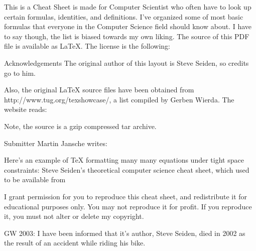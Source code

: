 

This is a Cheat Sheet is made for Computer Scientist who often have to look up certain formulas, identities, and definitions.
I've organized some of most basic formulas that everyone in the Computer Science field should know about. I have to say though, the list is biased towards my own liking.
The source of this PDF file is available as LaTeX. The license is the following:

Acknowledgements
The original author of this layout is Steve Seiden, so credits go to him.

Also, the original LaTeX source files have been obtained from http://www.tug.org/texshowcase/, a list compiled by Gerben Wierda.
The website reads:

Note, the source is a gzip compressed tar archive.

Submitter Martin Jansche writes:

Here's an example of TeX formatting many many equations under tight space constraints: Steve Seiden's theoretical computer science cheat sheet, which used to be available from

    I grant permission for you to reproduce this cheat sheet, and redistribute it for educational purposes only. You may not reproduce it for profit. If you reproduce it, you must not alter or delete my copyright.

GW 2003: I have been informed that it's author, Steve Seiden, died in 2002 as the result of an accident while riding his bike.

\bye
